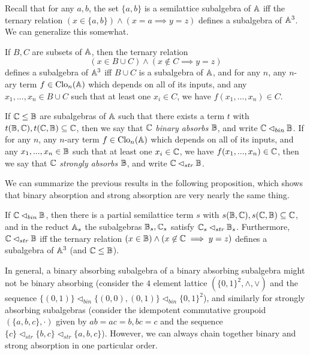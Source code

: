 \documentclass[letterpaper,11pt]{article}
\DeclareMathOperator{\Clo}{Clo}
\begin{document}
Recall that for any $a,b$, the set $\{a,b\}$ is a semilattice subalgebra of $\mathbb{A}$ iff the ternary relation $(x \in \{a,b\}) \wedge (x = a \implies y = z)$ defines a subalgebra of $\mathbb{A}^3$. We can generalize this somewhat.

\begin{prop} If $B,C$ are subsets of $\mathbb{A}$, then the ternary relation
\[
(x \in B\cup C) \wedge (x \not\in C \implies y=z)
\]
defines a subalgebra of $\mathbb{A}^3$ iff $B \cup C$ is a subalgebra of $\mathbb{A}$, and for any $n$, any $n$-ary term $f \in \Clo_n(\bA)$ which depends on all of its inputs, and any $x_1, ..., x_n \in B\cup C$ such that at least one $x_i \in C$, we have $f(x_1, ..., x_n) \in C$.
\end{prop}

\begin{defn} If $\mathbb{C} \le \mathbb{B}$ are subalgebras of $\mathbb{A}$ such that there exists a term $t$ with $t(\mathbb{B},\mathbb{C}), t(\mathbb{C},\mathbb{B}) \subseteq \mathbb{C}$, then we say that $\mathbb{C}$ \emph{binary absorbs} $\mathbb{B}$, and write $\mathbb{C} \lhd_{bin} \mathbb{B}$. If for any $n$, any $n$-ary term $f \in \Clo_n(\bA)$ which depends on all of its inputs, and any $x_1, ..., x_n \in \mathbb{B}$ such that at least one $x_i \in \mathbb{C}$, we have $f(x_1, ..., x_n) \in \mathbb{C}$, then we say that $\mathbb{C}$ \emph{strongly absorbs} $\mathbb{B}$, and write $\mathbb{C} \lhd_{str} \mathbb{B}$.
\end{defn}

We can summarize the previous results in the following proposition, which shows that binary absorption and strong absorption are very nearly the same thing.

\begin{prop}\label{bin-abs-semi} If $\mathbb{C} \lhd_{bin} \mathbb{B}$, then there is a partial semilattice term $s$ with $s(\mathbb{B},\mathbb{C}), s(\mathbb{C},\mathbb{B}) \subseteq \mathbb{C}$, and in the reduct $\mathbb{A}_s$ the subalgebras $\mathbb{B}_s, \mathbb{C}_s$ satisfy $\mathbb{C}_s \lhd_{str} \mathbb{B}_s$. Furthermore, $\mathbb{C} \lhd_{str} \mathbb{B}$ iff the ternary relation $(x \in \mathbb{B}) \wedge (x \not\in \mathbb{C} \implies y = z)$ defines a subalgebra of $\mathbb{A}^3$ (and $\mathbb{C} \le \mathbb{B}$).
\end{prop}

In general, a binary absorbing subalgebra of a binary absorbing subalgebra might not be binary absorbing (consider the $4$ element lattice $(\{0,1\}^2, \wedge, \vee)$ and the sequence $\{(0,1)\} \lhd_{bin} \{(0,0),(0,1)\} \lhd_{bin} \{0,1\}^2$), and similarly for strongly absorbing subalgebras (consider the idempotent commutative groupoid $(\{a,b,c\},\cdot)$ given by $ab = ac = b, bc = c$ and the sequence $\{c\} \lhd_{str} \{b,c\} \lhd_{str} \{a,b,c\}$). However, we can always chain together binary and strong absorption in one particular order.
\end{document}
